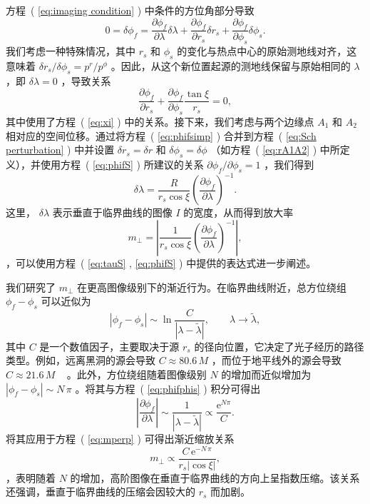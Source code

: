 \documentclass[aps,reprint,superscriptaddress,nofootinbib,floatfix,longbibliography,preprintnumbers]{revtex4-1}
\newcommand{\p}{\partial}
\newcommand{\ee}{\mathrm{e}}
\begin{document}
方程~(    \ref{eq:imaging condition}    ) 中条件的方位角部分导致
   \begin{equation}
   0=\delta\phi_{f} = \frac{\p\phi_f}{\p\lambda} \delta\lambda + \frac{\p\phi_f}{\p{r_s}} \delta r_s + \frac{\p\phi_f}{\p{\phi_s}} \delta\phi_s.
    \label{eq:Sch perturbation}
\end{equation}    我们考虑一种特殊情况，其中    $r_s$    和    $\phi_s$    的变化与热点中心的原始测地线对齐，这意味着    $\delta r_s/\delta \phi_s = p^r/p^\phi$    。因此，从这个新位置起源的测地线保留与原始相同的    $\lambda$    ，即    $\delta \lambda = 0$    ，导致关系
   \begin{equation}
    \frac{\p\phi_f}{\p r_s} + \frac{\p\phi_f}{\p \phi_s}\frac{\tan\xi}{r_s} = 0,\label{eq:phifsimp}
\end{equation}    其中使用了方程~(    \ref{eq:xi}    ) 中的关系。接下来，我们考虑与两个边缘点    $A_1$    和    $A_2$    相对应的空间位移。通过将方程~(    \ref{eq:phifsimp}    ) 合并到方程~(    \ref{eq:Sch perturbation}    ) 中并设置    $\delta r_s = \delta r$    和    $\delta \phi_s = \delta \phi$    （如方程~(    \ref{eq:rA1A2}    ) 中所定义），并使用方程~(    \ref{eq:phifS}    ) 所建议的关系    $\partial \phi_f / \partial \phi_s = 1$    ，我们得到
   \begin{equation}
    \delta\lambda=\frac{R}{r_s\cos\xi}\left(\frac{\p\phi_f}{\p\lambda}\right)^{-1}.
\end{equation}    这里，   $\delta \lambda$    表示垂直于临界曲线的图像    $I$    的宽度，从而得到放大率
   \begin{equation}
    m_{\perp}=\left|\frac{1}{r_s\cos\xi}\left(\frac{\p\phi_f}{\p \lambda}\right)^{-1}\right|,
    \label{eq:mperp}
\end{equation}    ，可以使用方程~(    \ref{eq:tauS}    ,    \ref{eq:phifS}    ) 中提供的表达式进一步阐述。  

我们研究了    $m_\perp$    在更高图像级别下的渐近行为。在临界曲线附近，总方位绕组    $\phi_f - \phi_s$    可以近似为~    \cite{Luminet:1979nyg,Gralla:2019xty,Gralla:2019drh,Tsukamoto:2020iez}    
   \begin{equation}
    |\phi_f - \phi_s| \sim \ln\frac{C}{|\lambda-\tilde{\lambda}|},\qquad \lambda\to \tilde{\lambda},
\label{eq:phifphis}
\end{equation}    其中    $C$    是一个数值因子，主要取决于源    $r_s$    的径向位置，它决定了光子经历的路径类型。例如，远离黑洞的源会导致    $C \approx 80.6\,M$    ，而位于地平线外的源会导致    $C \approx 21.6\,M$    ~    \cite{Gralla:2019xty}    。此外，方位绕组随着图像级别    $N$    的增加而近似增加为    $|\phi_f - \phi_s| \sim N\,\pi$    。将其与方程~(    \ref{eq:phifphis}    ) 积分可得出
   \begin{equation}
    \left|\frac{\p\phi_f}{\p\lambda}\right| \sim \frac{1}{|\lambda-\tilde{\lambda}|}\propto \frac{\ee^{N\pi}}{C}.
\end{equation}    将其应用于方程~(    \ref{eq:mperp}    ) 可得出渐近缩放关系
   \begin{equation}
    m_{\perp}\propto\frac{C\,\ee^{-N\,\pi}}{r_s|\cos\xi|},
\end{equation}    ，表明随着    $N$    的增加，高阶图像在垂直于临界曲线的方向上呈指数压缩。该关系还强调，垂直于临界曲线的压缩会因较大的    $r_s$    而加剧。
\end{document}
